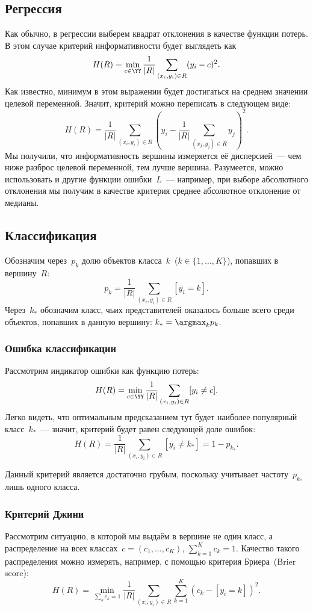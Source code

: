 \documentclass[12pt,fleqn]{article}
\begin{document}
\subsection{Регрессия}
Как обычно, в регрессии выберем квадрат отклонения в качестве функции потерь.
В этом случае критерий информативности будет выглядеть как
\[
    H(R)
    =
    \min_{c \in \YY}
    \frac{1}{|R|}
    \sum_{(x_i, y_i) \in R}
        (y_i - c)^2.
\]
Как известно, минимум в этом выражении будет достигаться на среднем значении целевой переменной.
Значит, критерий можно переписать в следующем виде:
\[
    H(R)
    =
    \frac{1}{|R|}
    \sum_{(x_i, y_i) \in R}
    \left(
        y_i
        -
        \frac{1}{|R|}
        \sum_{(x_j, y_j) \in R}
            y_j
    \right)^2.
\]
Мы получили, что информативность вершины измеряется её дисперсией~---
чем ниже разброс целевой переменной, тем лучше вершина.
Разумеется, можно использовать и другие функции ошибки~$L$~---
например, при выборе абсолютного отклонения мы получим в качестве критерия среднее абсолютное отклонение от медианы.

\subsection{Классификация}
Обозначим через~$p_{k}$ долю объектов класса~$k$~($k \in \{1, \dots, K\}$), попавших в вершину~$R$:
\[
    p_{k}
    =
    \frac{1}{|R|}
    \sum_{(x_i, y_i) \in R}
        [y_i = k].
\]
Через~$k_*$ обозначим класс, чьих представителей оказалось больше всего среди объектов,
попавших в данную вершину: $k_* = \argmax_k p_{k}$.

\subsubsection{Ошибка классификации}
Рассмотрим индикатор ошибки как функцию потерь:
\[
    H(R)
    =
    \min_{c \in \YY}
    \frac{1}{|R|}
    \sum_{(x_i, y_i) \in R}
        [y_i \neq c].
\]
Легко видеть, что оптимальным предсказанием тут будет наиболее популярный класс~$k_*$~---
значит, критерий будет равен следующей доле ошибок:
\[
    H(R)
    =
    \frac{1}{|R|}
    \sum_{(x_i, y_i) \in R}
        [y_i \neq k_*]
    =
    1 - p_{k_*}.
\]

Данный критерий является достаточно грубым,
поскольку учитывает частоту~$p_{k_*}$ лишь одного класса.

\subsubsection{Критерий Джини}
Рассмотрим ситуацию, в которой мы выдаём в вершине не один класс,
а распределение на всех классах~$c = (c_1, \dots, c_K)$, $\sum_{k = 1}^{K} c_k = 1$.
Качество такого распределения можно измерять, например, с помощью критерия Бриера~(Brier score):
\[
    H(R)
    =
    \min_{\sum_k c_k = 1}
    \frac{1}{|R|}
    \sum_{(x_i, y_i) \in R}
    \sum_{k = 1}^{K}
        (c_k - [y_i = k])^2.
\]
\end{document}
